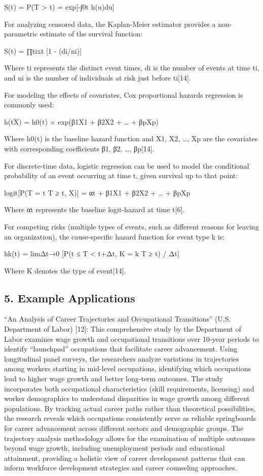 \documentclass[./main.tex]{subfiles}
\begin{document}
S(t) = P(T \textgreater{} t) = exp{[}-∫0t h(u)du{]}

For analyzing censored data, the Kaplan-Meier estimator provides a
non-parametric estimate of the survival function:

S(t) = ∏ti≤t {[}1 - (di/ni){]}

Where ti represents the distinct event times, di is the number of events
at time ti, and ni is the number of individuals at risk just before
ti{[}14{]}.

For modeling the effects of covariates, Cox proportional hazards
regression is commonly used:

h(t\textbar X) = h0(t) × exp(β1X1 + β2X2 + \ldots{} + βpXp)

Where h0(t) is the baseline hazard function and X1, X2, \ldots, Xp are
the covariates with corresponding coefficients β1, β2, \ldots,
βp{[}14{]}.

For discrete-time data, logistic regression can be used to model the
conditional probability of an event occurring at time t, given survival
up to that point:

logit{[}P(T = t \textbar{} T ≥ t, X){]} = αt + β1X1 + β2X2 + \ldots{} +
βpXp

Where αt represents the baseline logit-hazard at time t{[}6{]}.

For competing risks (multiple types of events, such as different reasons
for leaving an organization), the cause-specific hazard function for
event type k is:

hk(t) = limΔt→0 {[}P(t ≤ T \textless{} t+Δt, K = k \textbar{} T ≥ t) /
Δt{]}

Where K denotes the type of event{[}14{]}.

\subsection{5. Example Applications}\label{example-applications}

``An Analysis of Career Trajectories and Occupational Transitions''
(U.S. Department of Labor) {[}12{]}: This comprehensive study by the
Department of Labor examines wage growth and occupational transitions
over 10-year periods to identify ``launchpad'' occupations that
facilitate career advancement. Using longitudinal panel surveys, the
researchers analyze variations in trajectories among workers starting in
mid-level occupations, identifying which occupations lead to higher wage
growth and better long-term outcomes. The study incorporates both
occupational characteristics (skill requirements, licensing) and worker
demographics to understand disparities in wage growth among different
populations. By tracking actual career paths rather than theoretical
possibilities, the research reveals which occupations consistently serve
as reliable springboards for career advancement across different sectors
and demographic groups. The trajectory analysis methodology allows for
the examination of multiple outcomes beyond wage growth, including
unemployment periods and educational attainment, providing a holistic
view of career development patterns that can inform workforce
development strategies and career counseling approaches.
\end{document}
